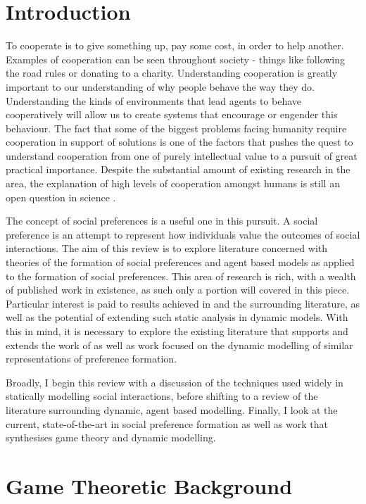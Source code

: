 \documentclass[11pt]{article}
\newcommand*{\np}{\par\noindent\newline}
\begin{document}
\newpage
\tableofcontents
\newpage
\section{Introduction}\label{intro}
To cooperate is to give something up, pay some cost, in order to help another. Examples of cooperation can be seen
throughout society - things like following the road rules or donating to a charity. Understanding cooperation is greatly
important to our understanding of why people behave the way they do. Understanding the kinds of environments that lead
agents to behave cooperatively will allow us to create systems that encourage or engender this behaviour. The fact that
some of the biggest problems facing humanity require cooperation in support of solutions is one of the factors that
pushes the quest to understand cooperation from one of purely intellectual value to a pursuit of great practical
importance. Despite the substantial amount of existing research in the area, the explanation of high levels of cooperation amongst humans is still an open question in science \citep{pennisi_how_2005}.

\np The concept of social preferences is a useful one in this pursuit. A social preference is an attempt to
represent how individuals value the outcomes of social interactions. The aim of this review is to explore literature
concerned with theories of the formation of social preferences and agent based models as applied to the formation of
social preferences. This area of research is rich, with a wealth of published work in existence, as such only a portion
will covered in this piece. Particular interest is paid to results achieved in \citet{alger_homo_2013} and the
surrounding literature, as well as the potential of extending such static analysis in dynamic models. With this in mind,
it is necessary to explore the existing literature that supports and extends the work of \citet{alger_homo_2013} as well
as work focused on the dynamic modelling of similar representations of preference formation.

\np Broadly, I begin this review with a discussion of the techniques used widely in statically modelling social interactions, before shifting to a review of the literature surrounding dynamic, agent based modelling.
Finally, I look at the current, state-of-the-art in social preference formation as well as work that
synthesises game theory and dynamic modelling.


\section{Game Theoretic Background}\label{social}
\end{document}
